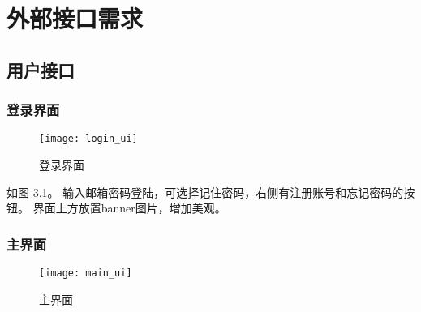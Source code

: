 \section{外部接口需求}
\subsection{用户接口}
% 
% 
% 
% 
% 


\subsubsection{登录界面}

\begin{figure}[h]
	\centering
	\texttt{[image: login\_ui]}
	\caption{登录界面} \label{fig:login_ui}
\end{figure}


如图 3.1。
输入邮箱密码登陆，可选择记住密码，右侧有注册账号和忘记密码的按钮。
界面上方放置banner图片，增加美观。

\clearpage
\subsubsection{主界面}
\begin{figure}[h]
	\centering
	\texttt{[image: main\_ui]}
	\caption{主界面} \label{fig:main_ui}
\end{figure}

